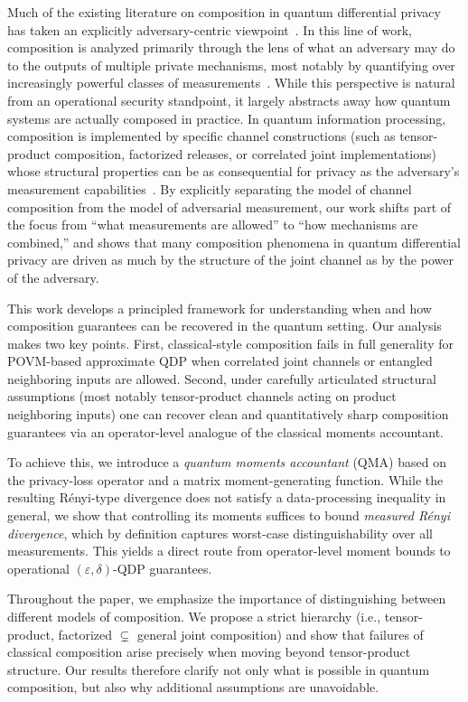 \documentclass[11pt]{article}
\theoremstyle{plain}
\theoremstyle{remark}
\begin{document}
Much of the existing literature on composition in quantum differential privacy has taken an explicitly adversary-centric viewpoint~\citep{hirche2022quantum, NuradhaGW24}.
In this line of work, composition is analyzed primarily through the lens of what an adversary may do to the outputs of multiple private mechanisms, most notably by quantifying over increasingly powerful classes of measurements~\citep{NuradhaGW24,nuradha2025MeasuredHS}.
While this perspective is natural from an operational security standpoint, it largely abstracts away how quantum systems are actually composed in practice.
In quantum information processing, composition is implemented by specific channel constructions (such as tensor-product composition, factorized releases, or correlated joint implementations) whose structural properties can be as consequential for privacy as the adversary's measurement capabilities~\cite{AaronsonR19}.
By explicitly separating the model of channel composition from the model of adversarial measurement, our work shifts part of the focus from ``what measurements are allowed'' to ``how mechanisms are combined,'' and shows that many composition phenomena in quantum differential privacy are driven as much by the structure of the joint channel as by the power of the adversary.

This work develops a principled framework for understanding when and how composition guarantees can be recovered in the quantum setting.
Our analysis makes two key points.
First, classical-style composition fails in full generality for POVM-based approximate QDP when correlated joint channels or entangled neighboring inputs are allowed.
Second, under carefully articulated structural assumptions (most notably tensor-product channels acting on product neighboring inputs) one can recover clean and quantitatively sharp composition guarantees via an operator-level analogue of the classical moments accountant.

To achieve this, we introduce a \emph{quantum moments accountant} (QMA) based on the privacy-loss operator and a matrix moment-generating function.
While the resulting R\'enyi-type divergence does not satisfy a data-processing inequality in general, we show that controlling its moments suffices to bound \emph{measured R\'enyi divergence}, which by definition captures worst-case distinguishability over all measurements.
This yields a direct route from operator-level moment bounds to operational $(\varepsilon,\delta)$-QDP guarantees.

Throughout the paper, we emphasize the importance of distinguishing between different models of composition.
We propose a strict hierarchy (i.e., tensor-product, factorized $\subsetneq$ general joint composition) and show that failures of classical composition arise precisely when moving beyond tensor-product structure.
Our results therefore clarify not only what is possible in quantum composition, but also why additional assumptions are unavoidable.
\end{document}
